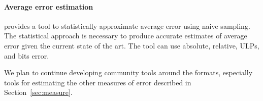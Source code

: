 \documentclass[main.tex]{subfiles}
\begin{document}
\paragraph{Average error estimation}
\name provides a tool to statistically approximate average error
  using naive sampling.
The statistical approach is necessary to produce accurate estimates
  of average error given the current state of the art.
The tool can use absolute, relative, ULPs, and bits error.

We plan to continue developing community tools around the \name formats,
  especially tools for estimating the other measures of error
  described in Section~\ref{sec:measure}.
\end{document}
